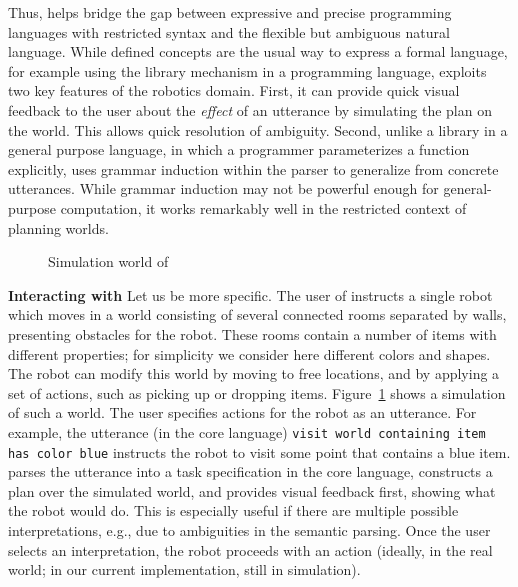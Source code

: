 Thus, \tool helps bridge the gap between expressive and precise programming languages with restricted syntax
and the flexible but ambiguous natural language.
While defined concepts are the usual way to express a formal language, for example using the library mechanism in a programming
language, \tool exploits two key features of the robotics domain.
First, it can provide quick visual feedback to the user about the \emph{effect} of an utterance by simulating
the plan on the world.
This allows quick resolution of ambiguity.
Second, unlike a library in a general purpose language, in which a programmer parameterizes a function explicitly,
\tool uses grammar induction within the parser to generalize from concrete utterances.
While grammar induction may not be powerful enough for general-purpose computation, it works remarkably well
in the restricted context of planning worlds.


\begin{figure}[t]
\caption{Simulation world of \tool}
\label{fig:simulationWorld}
\end{figure}


\smallskip
\noindent
\textbf{Interacting with \tool}
Let us be more specific.
The user of \tool instructs a single robot which moves in a world
consisting of several connected rooms separated by walls, presenting obstacles for the robot.
These rooms contain a number of items with different properties; for simplicity we consider here different
colors and shapes.
The robot can modify this world by moving to free locations,
and by applying a set of actions, such as picking up or dropping items.
Figure~\ref{fig:simulationWorld} shows a simulation of such a world.
The user specifies actions for the robot as an utterance.
For example, the utterance (in the core language) \lstinline{visit world containing item has color blue}
instructs the robot to visit some point that contains a blue item.
\tool parses the utterance into a task specification in the core language, constructs a plan over the simulated
world, and provides visual feedback first, showing what the robot would do.
This is especially useful if there are multiple possible interpretations, e.g., due to ambiguities
in the semantic parsing.
Once the user selects an interpretation, the robot proceeds with an action (ideally,
in the real world; in our current implementation, still in simulation). 

